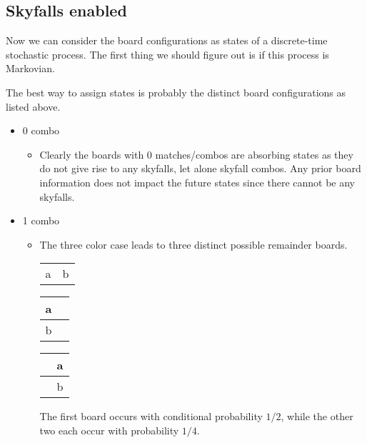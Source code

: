 \documentclass[12pt]{article}
\begin{document}
\subsection{Skyfalls enabled}
Now we can consider the board configurations as states of a discrete-time stochastic process. The first thing we should figure out is if this process is Markovian.

The best way to assign states is probably the distinct board configurations as listed above.

\begin{itemize}
    \item 0 combo
    \begin{itemize}
        \item Clearly the boards with 0 matches/combos are absorbing states as they do not give rise to any skyfalls, let alone skyfall combos. Any prior board information does not impact the future states since there cannot be any skyfalls.
    \end{itemize}
    \item 1 combo
    \begin{itemize}
        \item The three color case leads to three distinct possible remainder boards.
        \begin{center}
            \begin{tabular}{|c|c|}
            \hline
             &  \\
            \hline
            a & b \\
            \hline
            \end{tabular}
            \qquad
            \begin{tabular}{|c|c|}
            \hline
            a & \phantom{a} \\
            \hline
            b & \phantom{a} \\
            \hline
            \end{tabular}
            \qquad
            \begin{tabular}{|c|c|}
            \hline
            \phantom{a} & a \\
            \hline
            \phantom{a} & b \\
            \hline
            \end{tabular}
        \end{center}
        The first board occurs with conditional probability $1/2$, while the other two each occur with probability $1/4$.
        

\end{itemize}
\end{itemize}
\end{document}
